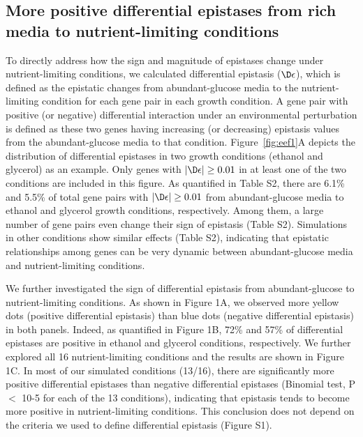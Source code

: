\subsection{More positive differential epistases from rich media to
nutrient-limiting conditions}

To directly address how the sign and magnitude of epistases change
under nutrient-limiting conditions, we calculated differential
epistasis ($\D\epsilon$), which is defined as the epistatic changes from
abundant-glucose media to the nutrient-limiting condition for each
gene pair in each growth condition. A gene pair with positive (or
negative) differential interaction under an environmental perturbation
is defined as these two genes having increasing (or decreasing)
epistasis values from the abundant-glucose media to that
condition. Figure~\ref{fig:eef1}A depicts the distribution of differential
epistases in two growth conditions (ethanol and glycerol) as an
example. Only genes with $\left|\D\epsilon\right| \geq 0.01$ in at least
one of the two conditions are included in this figure. As quantified
in Table S2, there are 6.1\% and 5.5\% of total gene pairs with
$\left|\D\epsilon\right| \geq 0.01$ from abundant-glucose media to ethanol
and glycerol growth conditions, respectively. Among them, a large
number of gene pairs even change their sign of epistasis (Table
S2). Simulations in other conditions show similar effects (Table S2),
indicating that epistatic relationships among genes can be very
dynamic between abundant-glucose media and nutrient-limiting
conditions.


We further investigated the sign of differential epistasis from
abundant-glucose to nutrient-limiting conditions. As shown in Figure
1A, we observed more yellow dots (positive differential epistasis)
than blue dots (negative differential epistasis) in both
panels. Indeed, as quantified in Figure 1B, 72\% and 57\% of
differential epistases are positive in ethanol and glycerol
conditions, respectively. We further explored all 16 nutrient-limiting
conditions and the results are shown in Figure 1C. In most of our
simulated conditions (13/16), there are significantly more positive
differential epistases than negative differential epistases (Binomial
test, P $<$ 10-5 for each of the 13 conditions), indicating that
epistasis tends to become more positive in nutrient-limiting
conditions. This conclusion does not depend on the criteria we used to
define differential epistasis (Figure S1).

